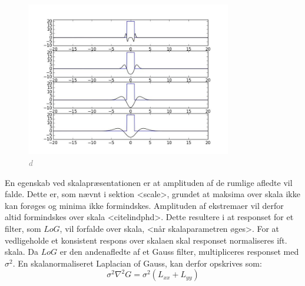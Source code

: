 \begin{figure}[H]
    \centering
    \includegraphics[width=0.80\textwidth]{fig/42.jpg}
    \vspace{-0.5em}
    \begin{center}
    \caption{\textcolor{gray}{\footnotesize \textit{
d   }}}
    \label{fig:laprespons}
     \end{center}
  \end{figure}
       \vspace{-2.7em}
\noindent
En egenskab ved skalapræsentationen er at amplituden af de rumlige afledte vil falde. Dette er, som nævnt i sektion <scale>, grundet
 at maksima over skala ikke kan forøges og minima ikke formindskes. Amplituden af ekstremaer vil derfor altid formindskes over skala <citelindphd>. Dette resultere i at responset for et filter, som $LoG$, vil forfalde over skala, <når skalaparametren øges>. For at vedligeholde et konsistent respons over skalaen skal responset normaliseres ift. skala. Da $LoG$ er den andenafledte af et Gauss filter, multipliceres responset med $\sigma^2$. En skalanormaliseret Laplacian of Gauss, kan derfor opskrives som:
$$\sigma^2 \nabla^2G = \sigma^2(L_{xx}+L_{yy})$$